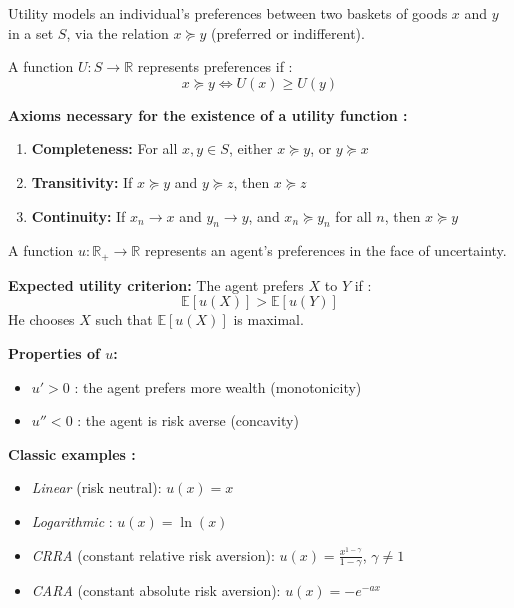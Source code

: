 \begin{f}
	Utility models an individual's preferences between two baskets of goods \(x\) and \(y\) in a set \(S\), via the relation \(x \succcurlyeq y\) (preferred or indifferent).
	
	A function \(U: S \rightarrow \mathbb{R}\) represents preferences if :
	\[
	x \succcurlyeq y \iff U(x) \geq U(y)
	\]
	
	\textbf{Axioms necessary for the existence of a utility function :}
	\begin{enumerate}
		\item \textbf{Completeness:} For all \(x, y \in S\), either \(x \succcurlyeq y\), or \(y \succcurlyeq x\)
		\item \textbf{Transitivity:} If \(x \succcurlyeq y\) and \(y \succcurlyeq z\), then \(x \succcurlyeq z\)
		\item \textbf{Continuity:} If \(x_n \to x\) and \(y_n \to y\), and \(x_n \succcurlyeq y_n\) for all \(n\), then \(x \succcurlyeq y\)
	\end{enumerate}
	
\end{f}


\begin{f}
	A function \(u : \mathbb{R}_+ \rightarrow \mathbb{R}\) represents an agent's preferences in the face of uncertainty.
	
	\textbf{Expected utility criterion:} The agent prefers \(X\) to \(Y\) if :
	\[
	\mathbb{E}[u(X)] > \mathbb{E}[u(Y)]
	\]
	He chooses \(X\) such that \(\mathbb{E}[u(X)]\) is maximal.
	
	\textbf{Properties of \(u\):}
	\begin{itemize}
		\item \(u'\! > 0\) : the agent prefers more wealth (monotonicity)
		\item \(u'' < 0\) : the agent is risk averse (concavity)
	\end{itemize}
	
	\textbf{Classic examples :}
	\begin{itemize}
		\item \textit{Linear} (risk neutral): \(u(x) = x\)
		\item \textit{Logarithmic} : \(u(x) = \ln(x)\)
		\item \textit{CRRA}  (constant relative risk aversion): \(u(x) = \frac{x^{1 - \gamma}}{1 - \gamma}\), \(\gamma \ne 1\)
		\item \textit{CARA}  (constant absolute risk aversion): \(u(x) = -e^{-a x}\)
	\end{itemize}
	
\end{f}


